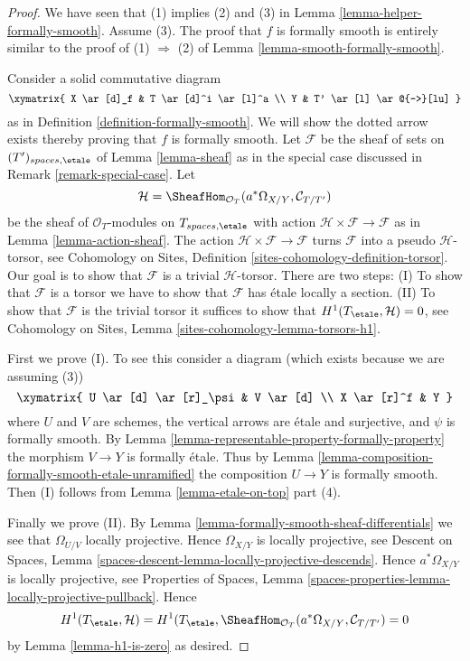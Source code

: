 \begin{proof}
We have seen that (1) implies (2) and (3) in
Lemma \ref{lemma-helper-formally-smooth}.
Assume (3).
The proof that $f$ is formally smooth is entirely similar to
the proof of (1) $\Rightarrow$ (2) of
Lemma \ref{lemma-smooth-formally-smooth}.

\medskip\noindent
Consider a solid commutative diagram
$$
\xymatrix{
X \ar[d]_f & T \ar[d]^i \ar[l]^a \\
Y & T' \ar[l] \ar@{-->}[lu]
}
$$
as in Definition \ref{definition-formally-smooth}.
We will show the dotted arrow exists thereby
proving that $f$ is formally smooth.
Let $\mathcal{F}$ be the sheaf of sets on $(T')_{spaces, \etale}$ of
Lemma \ref{lemma-sheaf} as in the special case discussed in
Remark \ref{remark-special-case}.
Let
$$
\mathcal{H} =
\SheafHom_{\mathcal{O}_T}(a^*\Omega_{X/Y}, \mathcal{C}_{T/T'})
$$
be the sheaf of $\mathcal{O}_T$-modules on $T_{spaces, \etale}$
with action $\mathcal{H} \times \mathcal{F} \to \mathcal{F}$ as in
Lemma \ref{lemma-action-sheaf}.
The action $\mathcal{H} \times \mathcal{F} \to \mathcal{F}$
turns $\mathcal{F}$ into a pseudo $\mathcal{H}$-torsor, see
Cohomology on Sites, Definition \ref{sites-cohomology-definition-torsor}.
Our goal is to show that $\mathcal{F}$ is a trivial $\mathcal{H}$-torsor.
There are two steps: (I) To show that $\mathcal{F}$ is a torsor
we have to show that $\mathcal{F}$ has \'etale locally a
section. (II) To show that $\mathcal{F}$ is the trivial torsor
it suffices to show that $H^1(T_\etale, \mathcal{H}) = 0$, see
Cohomology on Sites, Lemma \ref{sites-cohomology-lemma-torsors-h1}.

\medskip\noindent
First we prove (I). To see this consider a diagram
(which exists because we are assuming (3))
$$
\xymatrix{
U \ar[d] \ar[r]_\psi & V \ar[d] \\
X \ar[r]^f & Y
}
$$
where $U$ and $V$ are schemes, the vertical arrows are \'etale and
surjective, and $\psi$ is formally smooth. By
Lemma \ref{lemma-representable-property-formally-property}
the morphism $V \to Y$ is formally \'etale. Thus by
Lemma \ref{lemma-composition-formally-smooth-etale-unramified}
the composition $U \to Y$ is formally smooth. Then (I) follows from
Lemma \ref{lemma-etale-on-top} part (4).

\medskip\noindent
Finally we prove (II). By
Lemma \ref{lemma-formally-smooth-sheaf-differentials}
we see that $\Omega_{U/V}$ locally projective.
Hence $\Omega_{X/Y}$ is locally projective, see
Descent on Spaces,
Lemma \ref{spaces-descent-lemma-locally-projective-descends}.
Hence $a^*\Omega_{X/Y}$ is locally projective, see
Properties of Spaces, Lemma
\ref{spaces-properties-lemma-locally-projective-pullback}.
Hence
$$
H^1(T_\etale, \mathcal{H}) =
H^1(T_\etale,
\SheafHom_{\mathcal{O}_T}(a^*\Omega_{X/Y}, \mathcal{C}_{T/T'}) = 0
$$
by
Lemma \ref{lemma-h1-is-zero}
as desired.
\end{proof}

